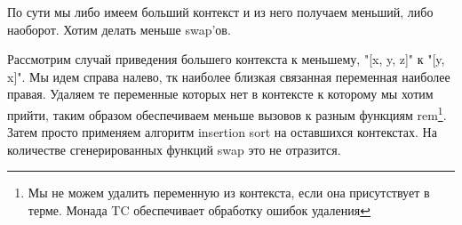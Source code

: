 По сути мы либо имеем больший контекст и из него получаем меньший, либо наоборот. Хотим делать меньше swap'ов.

Рассмотрим случай приведения большего контекста к меньшему, "[x, y, z]" к "[y, x]". Мы идем справа налево, тк наиболее близкая связанная переменная наиболее правая. Удаляем те переменные которых нет в контексте к которому мы хотим прийти, таким образом обеспечиваем меньше вызовов к разным функциям rem\footnote{Мы не можем удалить переменную из контекста, если она присутствует в терме. Монада TC обеспечивает обработку ошибок удаления}. Затем просто применяем алгоритм insertion sort на оставшихся контекстах. На количестве сгенерированных функций swap это не отразится.







